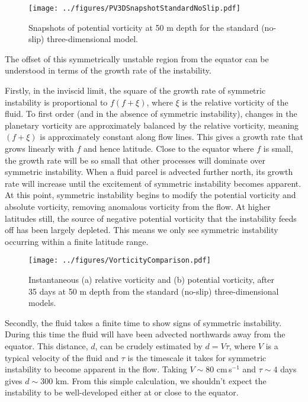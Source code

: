 \begin{figure}
    \centering
    \texttt{[image: ../figures/PV3DSnapshotStandardNoSlip.pdf]}
    \caption{Snapshots of potential vorticity at 50 m depth for the standard (no-slip) three-dimensional model.}
    \label{fig:PVStandardNoSlip3D}
\end{figure}

The offset of this symmetrically unstable region from the equator can be understood in terms of the growth rate of the instability.

Firstly, in the inviscid limit, the square of the growth rate of symmetric instability is proportional to $f(f + \xi)$, where $\xi$ is the relative vorticity of the fluid. To first order (and in the absence of symmetric instability), changes in the planetary vorticity are approximately balanced by the relative vorticity, meaning $(f + \xi)$ is approximately constant along flow lines. This gives a growth rate that grows linearly with $f$ and hence latitude. Close to the equator where $f$ is small, the growth rate will be so small that other processes will dominate over symmetric instability. When a fluid parcel is advected further north, its growth rate will increase until the excitement of symmetric instability becomes apparent. At this point, symmetric instability begins to modify the potential vorticity and absolute vorticity, removing anomalous vorticity from the flow. At higher latitudes still, the source of negative potential vorticity that the instability feeds off has been largely depleted. This means we only see symmetric instability occurring within a finite latitude range.

\begin{figure}
    \centering
    \texttt{[image: ../figures/VorticityComparison.pdf]}
    \caption{Instantaneous (a) relative vorticity and (b) potential vorticity, after 35 days at 50 m depth from the standard (no-slip) three-dimensional models.}
    \label{fig:EddyRelativeAndAbsoluteVorticity}
\end{figure}

Secondly, the fluid takes a finite time to show signs of symmetric instability. During this time the fluid will have been advected northwards away from the equator. This distance, $d$, can be crudely estimated by $d = V \tau$, where $V$ is a typical velocity of the fluid and $\tau$ is the timescale it takes for symmetric instability to become apparent in the flow. Taking $V\sim 80$ cm\,s$^{-1}$ and $\tau \sim 4$ days gives $d \sim 300$ km. From this simple calculation, we shouldn't expect the instability to be well-developed either at or close to the equator.


